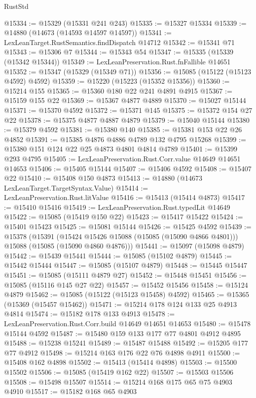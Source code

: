 \begin{lexlean}{RustStd}
\begin{coremodule}
@15334 := @15329 (@15331 @241 @243)
@15335 := @15327 @15334
@15339 := @14880 (@14673 (@14593 @14597 @14597))
@15341 := LexLeanTarget.RustSemantics.findDispatch @14712
@15342 := @15341 @71
@15343 := @15306 @7
@15344 := @15343 @54
@15347 := @15335 (@15339 (@15342 @15344))
@15349 := LexLeanPreservation.Rust.fnFallible @14651
@15352 := @15347 (@15329 (@15349 @71))
@15356 := @15085 (@15122 (@15123 @4592) @4592)
@15359 := @15220 (@15223 (@15352 @15356))
@15360 := @15214 @155
@15365 := @15360 @180 @22 @241 @4891 @4915
@15367 := @15159 @155 @22
@15369 := @15367 @4877 @4889
@15370 := @15027 @15144
@15371 := @15370 @4592
@15372 := @15371 @145
@15375 := @15372 @154 @27 @22
@15378 := @15375 @4877 @4887 @4879
@15379 := @15040 @15144
@15380 := @15379 @4592
@15381 := @15380 @140
@15385 := @15381 @153 @22 @26 @4852
@15391 := @15385 @4876 @4886 @4789 @132 @4795 @15268
@15399 := @15380 @151 @124 @22 @25 @4873 @4801 @4814 @4789
@15401 := @15399 @293 @4795
@15405 := LexLeanPreservation.Rust.Corr.value @14649 @14651 @14653
@15406 := @15405 @15144
@15407 := @15406 @4592
@15408 := @15407 @22
@15410 := @15408 @150 @4873
@15413 := @14880 (@14673 LexLeanTarget.TargetSyntax.Value)
@15414 := LexLeanPreservation.Rust.litValue
@15416 := @15413 (@15414 @4873)
@15417 := @15410 @15416
@15419 := LexLeanPreservation.Rust.typedLit @14649
@15422 := @15085 (@15419 @150 @22)
@15423 := @15417 @15422
@15424 := @15401 @15423
@15425 := @15081 @15144
@15426 := @15425 @4592
@15439 := @15378
    (@15391
      (@15424 @15426 @15088 (@15085 (@15090 @4866 @4801)))
      @15088
      (@15085 (@15090 @4860 @4876)))
@15441 := @15097 (@15098 @4879)
@15442 := @15439 @15441
@15444 := @15085 (@15102 @4879)
@15445 := @15442 @15444
@15447 := @15085 (@15107 @4879)
@15448 := @15445 @15447
@15451 := @15085 (@15111 @4879 @27)
@15452 := @15448 @15451
@15456 := @15085 (@15116 @145 @27 @22)
@15457 := @15452 @15456
@15458 := @15124 @4879
@15462 := @15085 (@15122 (@15123 @15458) @4592)
@15465 := @15365 (@15369 (@15457 @15462))
@15471 := @15214 @178 @124 @133 @25 @4913 @4814
@15474 := @15182 @178 @133 @4913
@15478 := LexLeanPreservation.Rust.Corr.build @14649 @14651 @14653
@15480 := @15478 @15144 @4592
@15487 := @15480 @159 @133 @177 @77 @4801 @4912 @4895
@15488 := @15238 @15241
@15489 := @15487 @15488
@15492 := @15205 @177 @77 @4912
@15498 := @15214 @163 @176 @22 @76 @4898 @4911
@15500 := @15408 @162 @4898
@15502 := @15413 (@15414 @4898)
@15503 := @15500 @15502
@15506 := @15085 (@15419 @162 @22)
@15507 := @15503 @15506
@15508 := @15498 @15507
@15514 := @15214 @168 @175 @65 @75 @4903 @4910
@15517 := @15182 @168 @65 @4903

\end{coremodule}
\end{lexlean}
